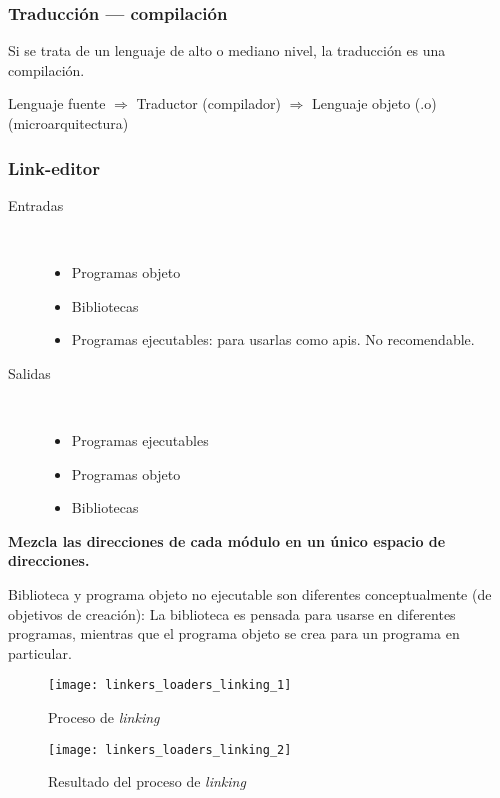 \documentclass[a4paper, twoside]{article}
\begin{document}
\subsubsection{Traducción --- compilación}

Si se trata de un lenguaje de alto o mediano nivel, la traducción es una
compilación.

\begin{center}
  Lenguaje fuente $\Rightarrow$ Traductor (compilador) $\Rightarrow$
  Lenguaje objeto (.o) (microarquitectura)
\end{center}

\subsubsection{Link-editor}

\begin{description}
  \item[Entradas] ~
  \begin{itemize}
    \item Programas objeto
    \item Bibliotecas
    \item Programas ejecutables: para usarlas como apis. No recomendable.
  \end{itemize}

  \item[Salidas] ~
  \begin{itemize}
    \item Programas ejecutables
    \item Programas objeto
    \item Bibliotecas
  \end{itemize}
\end{description}

\textbf{Mezcla las direcciones de cada módulo en un único espacio de
direcciones.}

Biblioteca y programa objeto no ejecutable son diferentes conceptualmente
(de objetivos de creación):
La biblioteca es pensada para usarse en diferentes programas, mientras que
el programa objeto se crea para un programa en particular.

\begin{figure}[h]
  \centering
  \texttt{[image: linkers\_loaders\_linking\_1]}
  \caption{Proceso de \textit{linking}}
  \label{fig:linkers_loaders_linking_1}
\end{figure}

\begin{figure}[h]
  \centering
  \texttt{[image: linkers\_loaders\_linking\_2]}
  \caption{Resultado del proceso de \textit{linking}}
  \label{fig:linkers_loaders_linking_2}
\end{figure}
\end{document}
